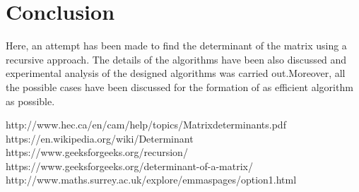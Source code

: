 \documentclass[conference]{IEEEtran}
\begin{document}
\section{Conclusion}
Here, an attempt has been made to find the determinant of the matrix using a recursive approach. The details of the algorithms have been also discussed and experimental analysis of the designed algorithms was carried out.Moreover, all the possible cases have been discussed for the formation of as efficient algorithm as possible.

\begin{thebibliography}{99}

http://www.hec.ca/en/cam/help/topics/Matrixdeterminants.pdf\\
 https://en.wikipedia.org/wiki/Determinant\\
https://www.geeksforgeeks.org/recursion/\\
https://www.geeksforgeeks.org/determinant-of-a-matrix/\\
http://www.maths.surrey.ac.uk/explore/emmaspages/option1.html
\\





\end{thebibliography}
\end{document}
